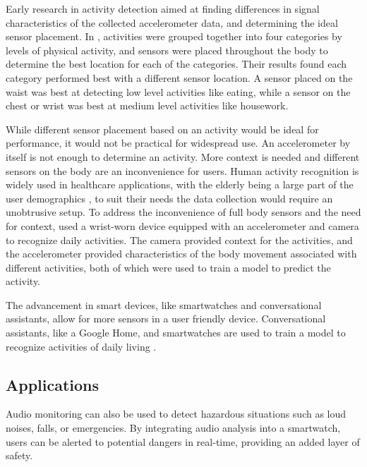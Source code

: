 \documentclass[conference]{IEEEtran}
\begin{document}
	Early research in activity detection aimed at finding differences in signal characteristics of the collected accelerometer data, and determining the ideal sensor placement. 
	In \cite{2011_Sensor_Positioning}, activities were grouped together into four categories by levels of physical activity, and sensors were placed throughout the body to determine the best location for each of the categories.
	Their results found each category performed best with a different sensor location. A sensor placed on the waist was best at detecting low level activities like eating, while a sensor on the chest or wrist was best at medium level activities like housework.
	
	While different sensor placement based on an activity would be ideal for performance, it would not be practical for widespread use.
	An accelerometer by itself is not enough to determine an activity. More context is needed and different sensors on the body are an inconvenience for users. 
	Human activity recognition is widely used in healthcare applications, with the elderly being a large part of the user demographics \cite{2018_Robust_Activity}, to suit their needs the data collection would require an unobtrusive setup.
	To address the inconvenience of full body sensors and the need for context, \cite{2012_WristSense} used a wrist-worn device equipped with an accelerometer and camera to recognize daily activities. 
	The camera provided context for the activities, and the accelerometer provided characteristics of the body movement associated with different activities, both of which were used to train a model to predict the activity.
	
	The advancement in smart devices, like smartwatches and conversational assistants, allow for more sensors in a user friendly device.
	Conversational assistants, like a Google Home, and smartwatches are used to train a model to recognize activities of daily living \cite{2021_Ok_Google} \cite{2022_Leveraging_sound}.
	
	
	\subsection{Applications}
	Audio monitoring can also be used to detect hazardous situations such as loud noises, falls, or emergencies. By integrating audio analysis into a smartwatch, users can be alerted to potential dangers in real-time, providing an added layer of safety.
	
\end{document}

